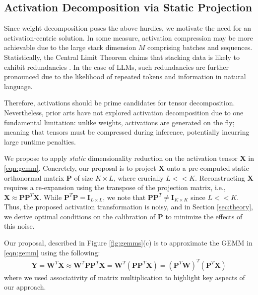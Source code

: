 \documentclass{article}
\theoremstyle{plain}
\begin{document}
\subsection{Activation Decomposition via Static Projection}
Since weight decomposition poses the above hurdles, we motivate the need for an activation-centric solution. In some measure, activation compression may be  more achievable due to the large stack dimension $M$ comprising batches and sequences. Statistically, the Central Limit Theorem claims that stacking data is likely to exhibit redundancies \cite{johnson2004clt}. In the case of LLMs, such redundancies are further pronounced due to the likelihood of repeated tokens and information in natural language.

Therefore, activations should be prime candidates for tensor decomposition. Nevertheless, prior arts have not explored activation decomposition due to one fundamental limitation: unlike weights, activations are generated on the fly; meaning that tensors must be compressed during inference, potentially incurring large runtime penalties.

We propose to apply \emph{static} dimensionality reduction on the activation tensor $\mathbf{X}$ in  \eqref{eqn:gemm}. Concretely, our proposal is to project $\mathbf{X}$ onto a pre-computed static orthonormal matrix $\mathbf{P}$ of size $K\times L$, where crucially $L<<K$. Reconstructing $\mathbf{X}$ requires a re-expansion using the transpose of the projection matrix, i.e., $\mathbf{X}\approx\mathbf{P} \mathbf{P}^T \mathbf{X}$. While $\mathbf{P}^T \mathbf{P} = \mathbf{I}_{L\times L}$, we note that $\mathbf{P} \mathbf{P}^T \neq \mathbf{I}_{K\times K}$ since $L<<K$. Thus, the proposed activation transformation is noisy, and in Section \ref{sec:theory}, we derive optimal conditions on the calibration of $\mathbf{P}$ to minimize the effects of this noise. 

Our proposal, described in Figure \ref{fig:gemms}(c) is to approximate the GEMM in  \eqref{eqn:gemm} using the following:
\begin{align}
    \label{eqn:espace_gemms}
    \mathbf{Y}=\mathbf{W}^T \mathbf{X} \approx \mathbf{W}^T \mathbf{P} \mathbf{P}^T \mathbf{X}= \mathbf{W}^T \left(\mathbf{P} \mathbf{P}^T \mathbf{X}\right) = \left( \mathbf{P}^T \mathbf{W}\right)^T\left(\mathbf{P}^T \mathbf{X}\right)
\end{align}
where we used associativity of matrix multiplication to highlight key aspects of our approach.
\end{document}
